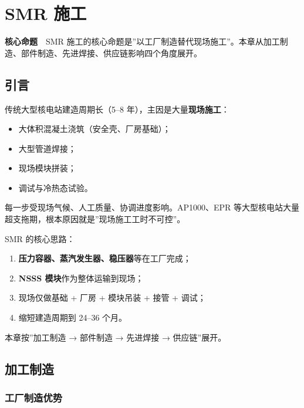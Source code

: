 \documentclass[
  UTF8,
  scheme=plain,
  fontsize=10pt,
  openany
]{ctexbook}
\begin{document}
\cleardoublepage

\chapter{SMR 施工}\label{smr-ux65bdux5de5}

\begin{epigraph}

\textbf{核心命题}　SMR
施工的核心命题是''以工厂制造替代现场施工''。本章从加工制造、部件制造、先进焊接、供应链影响四个角度展开。

\end{epigraph}

\section{引言}\label{ux5f15ux8a00-11}

传统大型核电站建造周期长（5--8 年），主因是大量\textbf{现场施工}：

\begin{itemize}
\tightlist
\item
  大体积混凝土浇筑（安全壳、厂房基础）；
\item
  大型管道焊接；
\item
  现场模块拼装；
\item
  调试与冷热态试验。
\end{itemize}

每一步受现场气候、人工质量、协调进度影响。AP1000、EPR
等大型核电站大量超支拖期，根本原因就是''现场施工工时不可控''。

SMR 的核心思路：

\begin{enumerate}
\def\labelenumi{\arabic{enumi}.}
\tightlist
\item
  \textbf{压力容器、蒸汽发生器、稳压器}等在工厂完成；
\item
  \textbf{NSSS 模块}作为整体运输到现场；
\item
  现场仅做基础 + 厂房 + 模块吊装 + 接管 + 调试；
\item
  缩短建造周期到 24--36 个月。
\end{enumerate}

本章按''加工制造 → 部件制造 → 先进焊接 → 供应链''展开。

\section{加工制造}\label{ux52a0ux5de5ux5236ux9020}

\subsection{工厂制造优势}\label{ux5de5ux5382ux5236ux9020ux4f18ux52bf}
\end{document}
